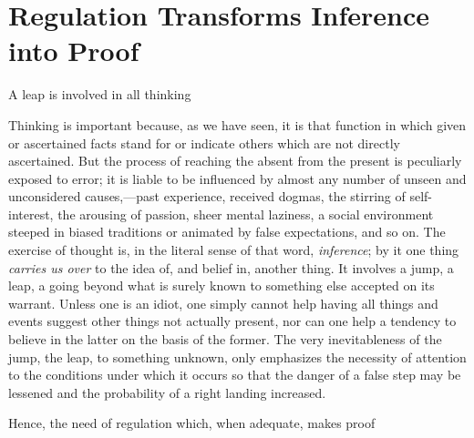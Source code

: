 \documentclass[letterpaper]{book}
\begin{document}
\section{Regulation Transforms Inference into Proof}

A leap is involved in all thinking

Thinking is important because, as we have seen, it is that function in
which given or ascertained facts stand for or indicate others which are
not directly ascertained. But the process of reaching the absent from
the present is peculiarly exposed to error; it is liable to be
influenced by almost any number of unseen and unconsidered
causes,---past experience, received dogmas, the stirring of
self-interest, the arousing of passion, sheer mental laziness, a social
environment steeped in biased traditions or animated by false
expectations, and so on. The exercise of thought is, in the literal
sense of that word, \emph{inference}; by it one thing \emph{carries us
over} to the idea of, and belief in, another thing. It involves a jump,
a leap, a going beyond what is surely known to something else accepted
on its warrant. Unless one is an idiot, one simply cannot help having
all things and events suggest other things not actually present, nor can
one help a tendency to believe in the latter on the basis of the former.
The very inevitableness of the jump, the leap, to something unknown,
only emphasizes the necessity of attention to the conditions under which
it occurs so that the danger of a false step may be lessened and the
probability of a right landing
increased.

Hence, the need of regulation which, when adequate, makes proof
\end{document}
